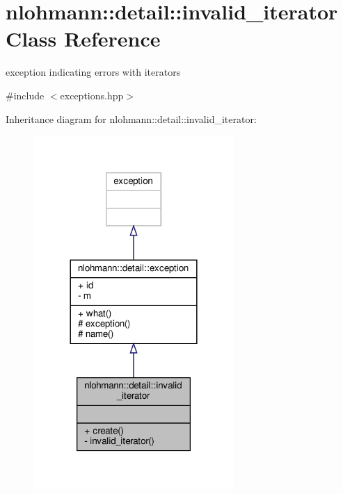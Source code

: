 \hypertarget{classnlohmann_1_1detail_1_1invalid__iterator}{}\section{nlohmann\+:\+:detail\+:\+:invalid\+\_\+iterator Class Reference}
\label{classnlohmann_1_1detail_1_1invalid__iterator}


exception indicating errors with iterators  




{\ttfamily \#include $<$exceptions.\+hpp$>$}



Inheritance diagram for nlohmann\+:\+:detail\+:\+:invalid\+\_\+iterator\+:
\nopagebreak
\begin{figure}[H]
\begin{center}
\leavevmode
\includegraphics[width=216pt]{classnlohmann_1_1detail_1_1invalid__iterator__inherit__graph}
\end{center}
\end{figure}


